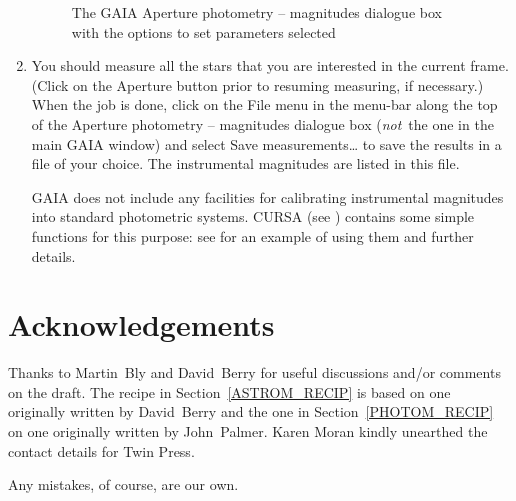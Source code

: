 \documentclass[twoside,11pt]{starlink}
\begin{document}
\begin{enumerate}
\begin{figure}[htbp]
     \begin{quote}
     \caption[Setting parameters in the \textsf{Aperture photometry --
      magnitudes} dialogue box]
      {The GAIA \textsf{Aperture photometry -- magnitudes} dialogue box with
      the options to set parameters selected
     \label{PHOTOM_R_APAR} }
     \end{quote}
  \end{figure}

  \item You should measure all the stars that you are interested in
   the current frame.  (Click on the \textsf{Aperture} button prior to
   resuming measuring, if necessary.)  When the job is done, click on the
   \textsf{File} menu in the menu-bar along the top of the \textsf{Aperture
   photometry -- magnitudes} dialogue box (\textit{not}\, the one in the
   main GAIA window) and select \textsf{Save measurements\ldots} to save the
   results in a file of your choice.  The instrumental magnitudes are
   listed in this file.

   GAIA does not include any facilities for calibrating instrumental
   magnitudes into standard photometric systems.  CURSA (see
   \cite{SUN190}) contains some simple functions
   for this purpose: see \/\cite{SC6} for an example
   of using them and further details.

\end{enumerate}



\newpage
{}
\section*{Acknowledgements}

Thanks to Martin~Bly and David~Berry
for useful discussions and/or comments on the draft.
The recipe in Section~\ref{ASTROM_RECIP} is based on one originally written
by David~Berry and the one in Section~\ref{PHOTOM_RECIP} on one originally
written by John~Palmer.  Karen Moran kindly unearthed the contact details
for Twin Press.

Any mistakes, of course, are our own.


\end{document}

